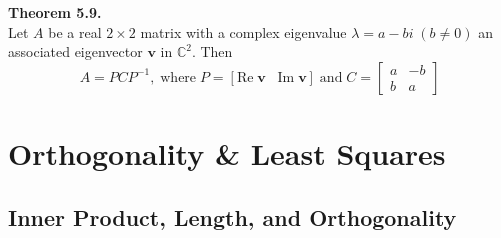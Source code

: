\documentclass[10pt]{book}
\newenvironment{boxthm}{\begin{mdframed}[backgroundcolor=gray!30,nobreak=true]}{\end{mdframed}}
\newcommand{\vect}[1]{\ensuremath{\boldsymbol{\mathbf{#1}}}}
\begin{document}
\begin{boxthm}
	\textbf{Theorem 5.9.} \\
	Let $A$ be a real $2 \times 2$ matrix with a complex eigenvalue $\lambda=a-bi \; (b\neq 0)$ an associated eigenvector $\vect{v}$ in $\mathbb{C}^2$.  Then
	$$A=PCP^{-1}, \; \text{where} \; P=[\text{Re}\; \vect{v} \; \;  \; \text{Im} \; \vect{v}] \; \text{and} \; C=\begin{bmatrix} a & -b\\ b & a \end{bmatrix}$$
\end{boxthm}


\newpage


\chapter{Orthogonality \& Least Squares}
\section{Inner Product, Length, and Orthogonality}
\end{document}
